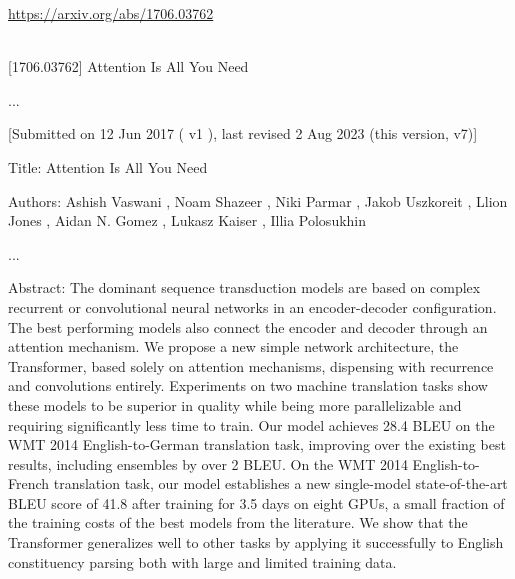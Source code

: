 \begin{textcolorbox}
\url{https://arxiv.org/abs/1706.03762}
\\\\

[1706.03762] Attention Is All You Need

...

[Submitted on 12 Jun 2017 (
v1
), last revised 2 Aug 2023 (this version, v7)]

Title:
Attention Is All You Need

Authors:
Ashish Vaswani
,
Noam Shazeer
,
Niki Parmar
,
Jakob Uszkoreit
,
Llion Jones
,
Aidan N. Gomez
,
Lukasz Kaiser
,
Illia Polosukhin

...

Abstract:
The dominant sequence transduction models are based on complex recurrent or convolutional neural networks in an encoder-decoder configuration. The best performing models also connect the encoder and decoder through an attention mechanism. We propose a new simple network architecture, the Transformer, based solely on attention mechanisms, dispensing with recurrence and convolutions entirely. Experiments on two machine translation tasks show these models to be superior in quality while being more parallelizable and requiring significantly less time to train. Our model achieves 28.4 BLEU on the WMT 2014 English-to-German translation task, improving over the existing best results, including ensembles by over 2 BLEU. On the WMT 2014 English-to-French translation task, our model establishes a new single-model state-of-the-art BLEU score of 41.8 after training for 3.5 days on eight GPUs, a small fraction of the training costs of the best models from the literature. We show that the Transformer generalizes well to other tasks by applying it successfully to English constituency parsing both with large and limited training data.


\end{textcolorbox}

